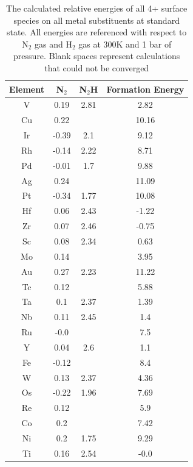 \documentclass[journal=jacsat,manuscript=article]{achemso}
\begin{document}
\begin{table}
\begin{center}
\begin{tabular}{| c | c | c | c |}
\hline
Element & N$_2$ & N$_2$H & Formation Energy \\
\hline
V & 0.19 & 2.81 & 2.82 \\
Cu & 0.22 &  & 10.16 \\
Ir & -0.39 & 2.1 & 9.12 \\
Rh & -0.14 & 2.22 & 8.71 \\
Pd & -0.01 & 1.7 & 9.88 \\
Ag & 0.24 &  & 11.09 \\
Pt & -0.34 & 1.77 & 10.08 \\
Hf & 0.06 & 2.43 & -1.22 \\
Zr & 0.07 & 2.46 & -0.75 \\
Sc & 0.08 & 2.34 & 0.63 \\
Mo & 0.14 &  & 3.95 \\
Au & 0.27 & 2.23 & 11.22 \\
Tc & 0.12 &  & 5.88 \\
Ta & 0.1 & 2.37 & 1.39 \\
Nb & 0.11 & 2.45 & 1.4 \\
Ru & -0.0 &  & 7.5 \\
Y & 0.04 & 2.6 & 1.1 \\
Fe & -0.12 &  & 8.4 \\
W & 0.13 & 2.37 & 4.36 \\
Os & -0.22 & 1.96 & 7.69 \\
Re & 0.12 &  & 5.9 \\
Co & 0.2 &  & 7.42 \\
Ni & 0.2 & 1.75 & 9.29 \\
Ti & 0.16 & 2.54 & -0.0 \\
\hline
\end{tabular}
\end{center}
\label{table:4+_energies}
\caption{The calculated relative energies of all 4+ surface species on all metal substituents at standard state. All energies are referenced with respect to N$_2$ gas and H$_2$ gas at 300K and 1 bar of pressure. Blank spaces represent calculations that could not be converged}
\end{table}
\end{document}
